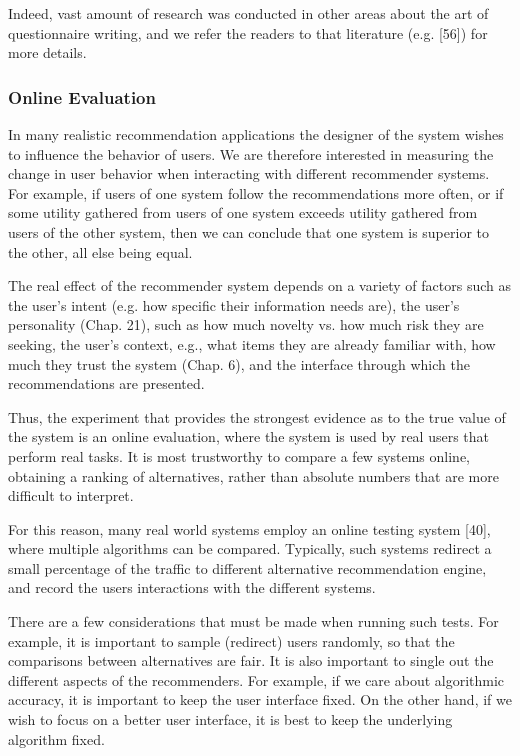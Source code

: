 Indeed, vast amount of research was conducted in other areas about the art of questionnaire writing, and we refer the readers to that literature (e.g. [56]) for more details.

\subsubsection{Online Evaluation}

In many realistic recommendation applications the designer of the system wishes to influence the behavior of users. We are therefore interested in measuring the change in user behavior when interacting with different recommender systems. For example, if users of one system follow the recommendations more often, or if some utility gathered from users of one system exceeds utility gathered from users of the other system, then we can conclude that one system is superior to the other, all else being equal.

The real effect of the recommender system depends on a variety of factors such as the user’s intent (e.g. how specific their information needs are), the user’s personality (Chap. 21), such as how much novelty vs. how much risk they are seeking, the user’s context, e.g., what items they are already familiar with, how much they trust the system (Chap. 6), and the interface through which the recommendations are presented.

Thus, the experiment that provides the strongest evidence as to the true value of the system is an online evaluation, where the system is used by real users that perform real tasks. It is most trustworthy to compare a few systems online, obtaining a ranking of alternatives, rather than absolute numbers that are more difficult to interpret.

For this reason, many real world systems employ an online testing system [40], where multiple algorithms can be compared. Typically, such systems redirect a small percentage of the traffic to different alternative recommendation engine, and record the users interactions with the different systems.

There are a few considerations that must be made when running such tests. For example, it is important to sample (redirect) users randomly, so that the comparisons between alternatives are fair. It is also important to single out the different aspects of the recommenders. For example, if we care about algorithmic accuracy, it is important to keep the user interface fixed. On the other hand, if we wish to focus on a better user interface, it is best to keep the underlying algorithm fixed.

